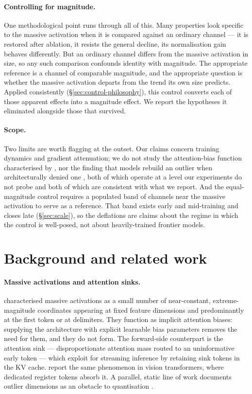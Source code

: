 \documentclass[11pt]{article}
\begin{document}
\paragraph{Controlling for magnitude.} One methodological point runs through all of
this. Many properties look specific to the massive activation when it is compared
against an ordinary channel --- it is restored after ablation, it resists the
general decline, its normalisation gain behaves differently. But an ordinary channel
differs from the massive activation in size, so any such comparison confounds
identity with magnitude. The appropriate reference is a channel of comparable
magnitude, and the appropriate question is whether the massive activation departs
from the trend its own size predicts. Applied consistently
(\S\ref{sec:control-philosophy}), this control converts each of those apparent
effects into a magnitude effect. We report the hypotheses it eliminated alongside
those that survived.

\paragraph{Scope.} Two limits are worth flagging at the outset. Our claims concern
training dynamics and gradient attenuation; we do not study the attention-bias
function characterised by \citet{sun2024massive}, nor the finding that models
rebuild an outlier when architecturally denied one \citep{vemula}, both of which
operate at a level our experiments do not probe and both of which are consistent
with what we report. And the equal-magnitude control requires a populated band of
channels near the massive activation to serve as a reference. That band exists early
and mid-training and closes late (\S\ref{sec:scale}), so the deflations are claims
about the regime in which the control is well-posed, not about heavily-trained
frontier models.

\section{Background and related work}\label{sec:background}

\paragraph{Massive activations and attention sinks.} \citet{sun2024massive}
characterised massive activations as a small number of near-constant,
extreme-magnitude coordinates appearing at fixed feature dimensions and
predominantly at the first token or at delimiters. They function as implicit
attention biases: supplying the architecture with explicit learnable bias
parameters removes the need for them, and they do not form. The forward-side
counterpart is the attention sink \citep{xiao2024streaming} --- disproportionate
attention mass routed to an uninformative early token --- which
\citet{xiao2024streaming} exploit for streaming inference by retaining sink tokens
in the KV cache. \citet{darcet2023vision} report the same phenomenon in vision
transformers, where dedicated register tokens absorb it. A parallel, static line of
work documents outlier dimensions as an obstacle to quantisation
\citep{dettmers2022llmint8,kovaleva2021bert,bondarenko2023quantizable}.
\end{document}
